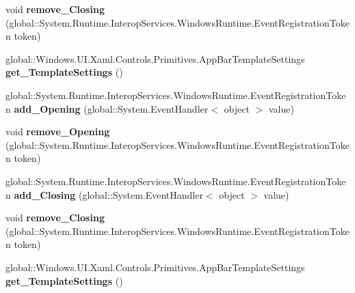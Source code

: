 \begin{DoxyCompactItemize}
void {\bfseries remove\+\_\+\+Closing} (global\+::\+System.\+Runtime.\+Interop\+Services.\+Windows\+Runtime.\+Event\+Registration\+Token token)
\item 
\mbox{\label{interface_windows_1_1_u_i_1_1_xaml_1_1_controls_1_1_i_app_bar3_a890144dceae211eb8ad8f8f7a8bea0d8}} 
global\+::\+Windows.\+U\+I.\+Xaml.\+Controls.\+Primitives.\+App\+Bar\+Template\+Settings {\bfseries get\+\_\+\+Template\+Settings} ()
\item 
\mbox{\label{interface_windows_1_1_u_i_1_1_xaml_1_1_controls_1_1_i_app_bar3_a62cddde1b89907b6b31a54a5172b02d5}} 
global\+::\+System.\+Runtime.\+Interop\+Services.\+Windows\+Runtime.\+Event\+Registration\+Token {\bfseries add\+\_\+\+Opening} (global\+::\+System.\+Event\+Handler$<$ object $>$ value)
\item 
\mbox{\label{interface_windows_1_1_u_i_1_1_xaml_1_1_controls_1_1_i_app_bar3_afaabe37e022a635508e675aa7ef0974c}} 
void {\bfseries remove\+\_\+\+Opening} (global\+::\+System.\+Runtime.\+Interop\+Services.\+Windows\+Runtime.\+Event\+Registration\+Token token)
\item 
\mbox{\label{interface_windows_1_1_u_i_1_1_xaml_1_1_controls_1_1_i_app_bar3_a6e424fac8c7cec71bad623c7c5e8ebd3}} 
global\+::\+System.\+Runtime.\+Interop\+Services.\+Windows\+Runtime.\+Event\+Registration\+Token {\bfseries add\+\_\+\+Closing} (global\+::\+System.\+Event\+Handler$<$ object $>$ value)
\item 
\mbox{\label{interface_windows_1_1_u_i_1_1_xaml_1_1_controls_1_1_i_app_bar3_aac12730dbba64fc7499059fd3646d24d}} 
void {\bfseries remove\+\_\+\+Closing} (global\+::\+System.\+Runtime.\+Interop\+Services.\+Windows\+Runtime.\+Event\+Registration\+Token token)
\item 
\mbox{\label{interface_windows_1_1_u_i_1_1_xaml_1_1_controls_1_1_i_app_bar3_a890144dceae211eb8ad8f8f7a8bea0d8}} 
global\+::\+Windows.\+U\+I.\+Xaml.\+Controls.\+Primitives.\+App\+Bar\+Template\+Settings {\bfseries get\+\_\+\+Template\+Settings} ()

\end{DoxyCompactItemize}
